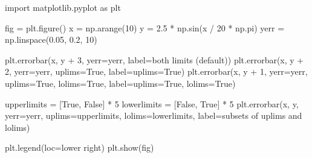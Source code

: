 \documentclass[
  letterpaper,
  DIV=11,
  numbers=noendperiod,
  oneside]{scrartcl}
\newenvironment{Shaded}{\begin{snugshade}}{\end{snugshade}}
\newcommand{\DecValTok}[1]{\textcolor[rgb]{0.68,0.00,0.00}{#1}}
\newcommand{\FloatTok}[1]{\textcolor[rgb]{0.68,0.00,0.00}{#1}}
\newcommand{\ImportTok}[1]{\textcolor[rgb]{0.00,0.46,0.62}{#1}}
\newcommand{\NormalTok}[1]{\textcolor[rgb]{0.00,0.23,0.31}{#1}}
\newcommand{\OperatorTok}[1]{\textcolor[rgb]{0.37,0.37,0.37}{#1}}
\newcommand{\StringTok}[1]{\textcolor[rgb]{0.13,0.47,0.30}{#1}}
\newcommand{\VariableTok}[1]{\textcolor[rgb]{0.07,0.07,0.07}{#1}}
\begin{document}
\begin{Shaded}
\begin{Highlighting}[]
\ImportTok{import}\NormalTok{ matplotlib.pyplot }\ImportTok{as}\NormalTok{ plt}

\NormalTok{fig }\OperatorTok{=}\NormalTok{ plt.figure()}
\NormalTok{x }\OperatorTok{=}\NormalTok{ np.arange(}\DecValTok{10}\NormalTok{)}
\NormalTok{y }\OperatorTok{=} \FloatTok{2.5} \OperatorTok{*}\NormalTok{ np.sin(x }\OperatorTok{/} \DecValTok{20} \OperatorTok{*}\NormalTok{ np.pi)}
\NormalTok{yerr }\OperatorTok{=}\NormalTok{ np.linspace(}\FloatTok{0.05}\NormalTok{, }\FloatTok{0.2}\NormalTok{, }\DecValTok{10}\NormalTok{)}

\NormalTok{plt.errorbar(x, y }\OperatorTok{+} \DecValTok{3}\NormalTok{, yerr}\OperatorTok{=}\NormalTok{yerr, label}\OperatorTok{=}\StringTok{\textquotesingle{}both limits (default)\textquotesingle{}}\NormalTok{)}
\NormalTok{plt.errorbar(x, y }\OperatorTok{+} \DecValTok{2}\NormalTok{, yerr}\OperatorTok{=}\NormalTok{yerr, uplims}\OperatorTok{=}\VariableTok{True}\NormalTok{, label}\OperatorTok{=}\StringTok{\textquotesingle{}uplims=True\textquotesingle{}}\NormalTok{)}
\NormalTok{plt.errorbar(x, y }\OperatorTok{+} \DecValTok{1}\NormalTok{, yerr}\OperatorTok{=}\NormalTok{yerr, uplims}\OperatorTok{=}\VariableTok{True}\NormalTok{, lolims}\OperatorTok{=}\VariableTok{True}\NormalTok{,}
\NormalTok{             label}\OperatorTok{=}\StringTok{\textquotesingle{}uplims=True, lolims=True\textquotesingle{}}\NormalTok{)}

\NormalTok{upperlimits }\OperatorTok{=}\NormalTok{ [}\VariableTok{True}\NormalTok{, }\VariableTok{False}\NormalTok{] }\OperatorTok{*} \DecValTok{5}
\NormalTok{lowerlimits }\OperatorTok{=}\NormalTok{ [}\VariableTok{False}\NormalTok{, }\VariableTok{True}\NormalTok{] }\OperatorTok{*} \DecValTok{5}
\NormalTok{plt.errorbar(x, y, yerr}\OperatorTok{=}\NormalTok{yerr, uplims}\OperatorTok{=}\NormalTok{upperlimits, lolims}\OperatorTok{=}\NormalTok{lowerlimits,}
\NormalTok{             label}\OperatorTok{=}\StringTok{\textquotesingle{}subsets of uplims and lolims\textquotesingle{}}\NormalTok{)}

\NormalTok{plt.legend(loc}\OperatorTok{=}\StringTok{\textquotesingle{}lower right\textquotesingle{}}\NormalTok{)}
\NormalTok{plt.show(fig)}
\end{Highlighting}
\end{Shaded}
\end{document}
